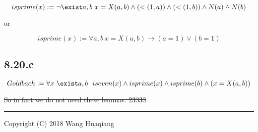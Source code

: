 \[ isprime(x) := \neg \exist a,b \ x=X(a,b)\wedge(<(1,a))\wedge(<(1,b))\wedge N(a) \wedge N(b)\]

or

\[ isprime(x) := \forall a,b \ x=X(a,b)\rightarrow (a=1)\vee (b=1)\]

\hypertarget{c}{%
\subsection{8.20.c}\label{c}}

\[Goldbach := \forall x \ \exist a,b \ \ iseven(x) \wedge isprime(x) \wedge isprime(b) \wedge (x=X(a,b))\]

\sout{So in fact we do not need these lemmas. 23333}

\begin{center}\rule{0.5\linewidth}{\linethickness}\end{center}

Copyright (C) 2018 Wang Huaqiang

